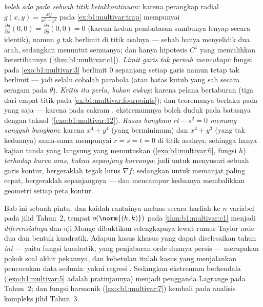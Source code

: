 \begin{remark}
\label{rem:b1:multivar:pitfalls}
\emph{ boleh ada pada sebuah titik
ketakkontinuan}: karena perangkap radial $g(x,y) = \frac{xy}{x^2+y^2}$ pada
\cref{ex:b1:multivar:trap} mempunyai $\frac{\partial g}{\partial
x}(0,0) = \frac{\partial g}{\partial y}(0,0) = 0$ (karena kedua pembatasan
sumbunya lenyap secara identik), namun $g$ tak berlimit di
titik asalnya --- sebab  hanya menyelidik dua arah, sedangkan  menuntut
semuanya; dan hanya hipotesis $C^1$ yang memulihkan ketertibannya
(\cref{thm:b1:multivar:c1}).
\emph{Limit garis tak pernah mencukupi}: fungsi pada \cref{exo:b1:multivar:3}
berlimit $0$ sepanjang setiap garis namun tetap tak berlimit ---
jadi selalu cobalah parabola (atau batas kutub yang sah secara seragam pada
$\theta$).
\emph{Kritis itu perlu, bukan cukup}: karena pelana bertaburan
(tiga dari empat titik pada \cref{ex:b1:multivar:fourpoints}); dan
teoremanya berlaku pada  yang \emph{} saja --- karena pada cakram ,
ekstremumnya boleh duduk pada batasnya dengan  taknol
(\cref{exo:b1:multivar:12}).
\emph{Kasus bungkam $rt - s^2 = 0$ memang sungguh bungkam}: karena $x^4
+ y^4$ (yang berminimum) dan $x^3 + y^3$ (yang tak keduanya) sama-sama mempunyai $r = s = t
= 0$ di titik asalnya; sehingga hanya kajian tanda yang langsung yang memutuskan
(\cref{exo:b1:multivar:6}, fungsi $h$).
\emph{  terhadap kurva aras, bukan sepanjang
kurvanya}: jadi untuk menyusuri sebuah garis kontur, bergeraklah tegak lurus $\nabla
f$; sedangkan untuk memanjat paling cepat, bergeraklah sepanjangnya --- dan mencampur keduanya membalikkan
geometri setiap peta kontur.
\end{remark}

\begin{remark}
\label{rem:b1:multivar:whereused}
Bab ini sebuah pintu.  dan kaidah rantainya meluas
secara harfiah ke $n$ variabel pada jilid Tahun~2, tempat
$o(\norm{(h,k)})$ pada \cref{thm:b1:multivar:c1} menjadi
\emph{diferensialnya} dan uji Monge dibuktikan selengkapnya lewat
rumus Taylor orde dua dan bentuk kuadratik. Adapun kasus khusus
yang dapat diselesaikan tahun \emph{ini} --- yaitu fungsi kuadratik,
yang penjabaran orde duanya persis --- merupakan pokok
soal akhir pekannya, dan kebetulan itulah kasus yang menjalankan
pencocokan data sedunia: yakni regresi . Sedangkan ekstremum
berkendala (\cref{exo:b1:multivar:5} adalah pratinjaunya) menjadi pengganda
Lagrange pada Tahun~2; dan fungsi harmonik
(\cref{exo:b1:multivar:7}) kembali pada analisis kompleks jilid
Tahun~3.
\end{remark}

